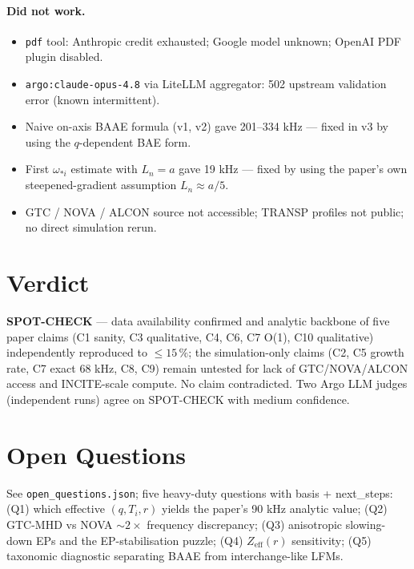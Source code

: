 \documentclass[11pt]{article}
\begin{document}
\paragraph{Did not work.}
\begin{itemize}
  \item \texttt{pdf} tool: Anthropic credit exhausted; Google model unknown; OpenAI PDF plugin disabled.
  \item \texttt{argo:claude-opus-4.8} via LiteLLM aggregator: 502 upstream validation error (known intermittent).
  \item Naive on-axis BAAE formula (v1, v2) gave 201--334 kHz --- fixed in v3 by using the $q$-dependent BAE form.
  \item First $\omega_{*i}$ estimate with $L_n=a$ gave 19 kHz --- fixed by using the paper's own steepened-gradient assumption $L_n\approx a/5$.
  \item GTC / NOVA / ALCON source not accessible; TRANSP profiles not public; no direct simulation rerun.
\end{itemize}

\section{Verdict}

\textbf{SPOT-CHECK} --- data availability confirmed and analytic backbone of five paper claims (C1 sanity, C3 qualitative, C4, C6, C7 O(1), C10 qualitative) independently reproduced to $\le15\,\%$; the simulation-only claims (C2, C5 growth rate, C7 exact 68 kHz, C8, C9) remain untested for lack of GTC/NOVA/ALCON access and INCITE-scale compute. No claim contradicted. Two Argo LLM judges (independent runs) agree on SPOT-CHECK with medium confidence.

\section*{Open Questions}
See \texttt{open\_questions.json}; five heavy-duty questions with basis + next\_steps: (Q1) which effective $(q, T_i, r)$ yields the paper's 90 kHz analytic value; (Q2) GTC-MHD vs NOVA $\sim2\times$ frequency discrepancy; (Q3) anisotropic slowing-down EPs and the EP-stabilisation puzzle; (Q4) $Z_{\mathrm{eff}}(r)$ sensitivity; (Q5) taxonomic diagnostic separating BAAE from interchange-like LFMs.
\end{document}
